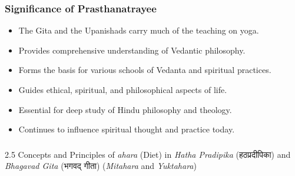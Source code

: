 \begin{frame}[fragile]\frametitle{Significance of Prasthanatrayee}

      \begin{itemize}
		\item The Gita and the Upanishads carry much of the teaching on yoga.
		\item Provides comprehensive understanding of Vedantic philosophy.
		\item Forms the basis for various schools of Vedanta and spiritual practices.
		\item Guides ethical, spiritual, and philosophical aspects of life.
		\item Essential for deep study of Hindu philosophy and theology.
		\item Continues to influence spiritual thought and practice today.
	  \end{itemize}

\end{frame}


\begin{frame}[fragile]\frametitle{}
\begin{center}
{\Large 2.5 Concepts and Principles of \textit{ahara} (Diet) in \textit{Hatha Pradipika} (हठप्रदीपिका) and \textit{Bhagavad Gita} (भगवद् गीता) (\textit{Mitahara} and \textit{Yuktahara})}
\end{center}
\end{frame}



